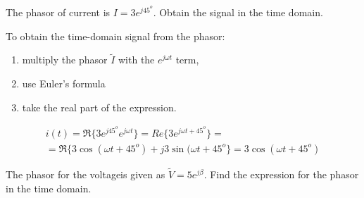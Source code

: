 \documentclass{ximera}
\begin{document}
\begin{example}
The phasor of current is  $I=3 e^{j 45^o}$. Obtain the signal in the time domain.


\begin{explanation}
  To obtain the time-domain signal from the phasor:
\begin{enumerate}
\item multiply the phasor $\tilde{I}$ with the $ e^{j\omega t}$ term, 
\item use Euler's formula 
\item take the real part of the expression.
\end{enumerate}  
   


\begin{eqnarray}
i(t) = \Re\{ 3 e^{ j 45^o}  e^{j\omega t} \} =  Re\{3  e^{j \omega t + 45^o}  \} = \nonumber \\ = \Re \{ 3 \cos (\omega t + 45^o ) + j 3 \sin (\omega t + 45^o \} = 3  \cos (\omega t + 45^o ) \label{phtotd}
\end{eqnarray}


\end{explanation}


\end{example}


\begin{question}
The phasor for the  voltageis given as $\tilde{V}= 5 e^{ j \beta } $. Find the expression for the phasor in the time domain.
\begin{multipleChoice}  
\end{multipleChoice} 
\end{question}
\end{document}
